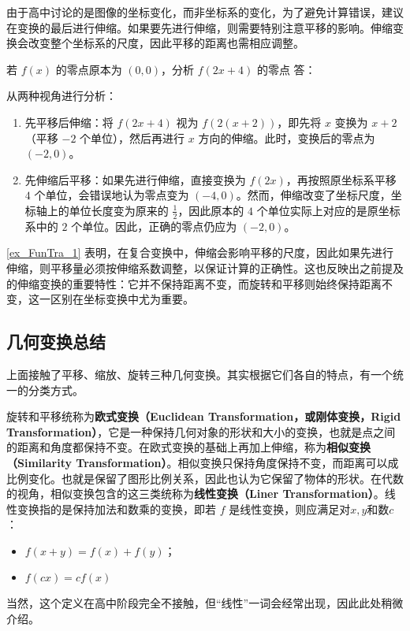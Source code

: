 由于高中讨论的是图像的坐标变化，而非坐标系的变化，为了避免计算错误，建议在变换的最后进行伸缩。如果要先进行伸缩，则需要特别注意平移的影响。伸缩变换会改变整个坐标系的尺度，因此平移的距离也需相应调整。

\begin{example}{若 $f(x)$ 的零点原本为 $(0,0)$，分析 $f(2x+4)$ 的零点}\label{ex_FunTra_1}
答：

从两种视角进行分析：

\begin{enumerate}
\item 先平移后伸缩：将 $f(2x+4)$ 视为 $f(2(x+2))$，即先将 $x$ 变换为 $x+2$（平移 $-2$ 个单位），然后再进行 $x$ 方向的伸缩。此时，变换后的零点为 $(-2,0)$。
\item 先伸缩后平移：如果先进行伸缩，直接变换为 $f(2x)$，再按照原坐标系平移 $4$ 个单位，会错误地认为零点变为 $(-4,0)$。然而，伸缩改变了坐标尺度，坐标轴上的单位长度变为原来的 $\displaystyle\frac{1}{2}$，因此原本的 $4$ 个单位实际上对应的是原坐标系中的 $2$ 个单位。因此，正确的零点仍应为 $(-2,0)$。
\end{enumerate}
\end{example}

\autoref{ex_FunTra_1} 表明，在复合变换中，伸缩会影响平移的尺度，因此如果先进行伸缩，则平移量必须按伸缩系数调整，以保证计算的正确性。这也反映出之前提及的伸缩变换的重要特性：它并不保持距离不变，而旋转和平移则始终保持距离不变，这一区别在坐标变换中尤为重要。

\subsection{几何变换总结}\label{sub_FunTra_4}

上面接触了平移、缩放、旋转三种几何变换。其实根据它们各自的特点，有一个统一的分类方式。

旋转和平移统称为\textbf{欧式变换（Euclidean Transformation，或刚体变换，Rigid Transformation）}，它是一种保持几何对象的形状和大小的变换，也就是点之间的距离和角度都保持不变。在欧式变换的基础上再加上伸缩，称为\textbf{相似变换（Similarity Transformation）}。相似变换只保持角度保持不变，而距离可以成比例变化。也就是保留了图形比例关系，因此也认为它保留了物体的形状。在代数的视角，相似变换包含的这三类统称为\textbf{线性变换（Liner Transformation）}。线性变换指的是保持加法和数乘的变换，即若 $f$ 是线性变换，则应满足对$x,y$和数$c$：
\begin{itemize}
\item $f(x + y) = f(x) + f(y)$；
\item $f(cx) = cf(x)$
\end{itemize}
当然，这个定义在高中阶段完全不接触，但“线性”一词会经常出现，因此此处稍微介绍。

